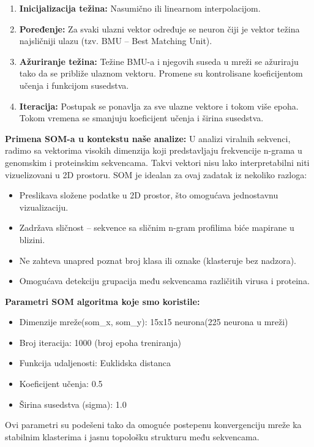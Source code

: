 \documentclass[a4paper,12pt]{article}
\begin{document}
\begin{enumerate}
  \item \textbf{Inicijalizacija težina:} Nasumično ili linearnom interpolacijom.
  \item \textbf{Poređenje:} Za svaki ulazni vektor određuje se neuron čiji je vektor težina najsličniji ulazu (tzv. BMU – Best Matching Unit).
  \item \textbf{Ažuriranje težina:} Težine BMU-a i njegovih suseda u mreži se ažuriraju tako da se približe ulaznom vektoru. Promene su kontrolisane koeficijentom učenja i funkcijom susedstva.
  \item \textbf{Iteracija:} Postupak se ponavlja za sve ulazne vektore i tokom više epoha. Tokom vremena se smanjuju koeficijent učenja i širina susedstva.
\end{enumerate}

\textbf{Primena SOM-a u kontekstu naše analize:} U analizi viralnih sekvenci, radimo sa vektorima visokih dimenzija koji predstavljaju frekvencije n-grama u genomskim i proteinskim sekvencama. Takvi vektori nisu lako interpretabilni niti vizuelizovani u 2D prostoru. SOM je idealan za ovaj zadatak iz nekoliko razloga:
\begin{itemize}
    \item Preslikava složene podatke u 2D prostor, što omogućava jednostavnu vizualizaciju.
    \item Zadržava sličnost – sekvence sa sličnim n-gram profilima biće mapirane u blizini.
    \item Ne zahteva unapred poznat broj klasa ili oznake (klasteruje bez nadzora).
    \item Omogućava detekciju grupacija među sekvencama različitih virusa i proteina.
\end{itemize}

\textbf{Parametri SOM algoritma koje smo koristile:}
\begin{itemize}
    \item Dimenzije mreže(som\_x, som\_y): 15x15 neurona(225 neurona u mreži)
    \item Broj iteracija: 1000 (broj epoha treniranja)
    \item Funkcija udaljenosti: Euklidska distanca
    \item Koeficijent učenja: 0.5
    \item Širina susedstva (sigma): 1.0
\end{itemize}

Ovi parametri su podešeni tako da omoguće postepenu konvergenciju mreže ka stabilnim klasterima i jasnu topološku strukturu među sekvencama.
\end{document}
